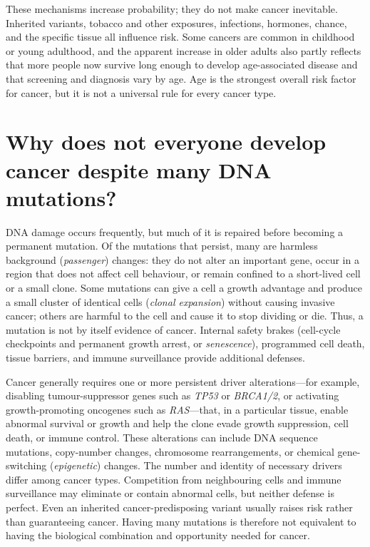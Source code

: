 \documentclass[11pt,oneside]{report}
\begin{document}
These mechanisms increase probability; they do not make cancer inevitable.
Inherited variants, tobacco and other exposures, infections, hormones, chance,
and the specific tissue all influence risk. Some cancers are common in
childhood or young adulthood, and the apparent increase in older adults also
partly reflects that more people now survive long enough to develop
age-associated disease and that screening and diagnosis vary by age. Age is the
strongest overall risk factor for cancer, but it is not a universal rule for
every cancer type.

\section{Why does not everyone develop cancer despite many DNA mutations?}

DNA damage occurs frequently, but much of it is repaired before becoming a
permanent mutation. Of the mutations that persist, many are harmless background
(\emph{passenger}) changes: they do not alter an important gene, occur in a
region that does not affect cell behaviour, or remain confined to a short-lived
cell or a small clone. Some mutations can give a cell a growth advantage and
produce a small cluster of identical cells (\emph{clonal expansion}) without
causing invasive cancer; others are harmful to the cell and cause it to stop
dividing or die. Thus, a mutation is not by itself evidence of cancer.
Internal safety brakes (cell-cycle checkpoints and permanent growth arrest, or
\emph{senescence}), programmed cell death, tissue barriers, and immune
surveillance provide additional defenses.

Cancer generally requires one or more persistent driver alterations—for
example, disabling tumour-suppressor genes such as \emph{TP53} or
\emph{BRCA1/2}, or activating growth-promoting oncogenes such as \emph{RAS}—that,
in a particular tissue, enable abnormal survival or growth and help the clone
evade growth suppression, cell death, or immune control. These alterations can
include DNA sequence mutations, copy-number changes, chromosome rearrangements,
or chemical gene-switching (\emph{epigenetic}) changes. The number and identity of necessary drivers differ among
cancer types. Competition from neighbouring
cells and immune surveillance may eliminate or contain abnormal cells, but
neither defense is perfect. Even an inherited cancer-predisposing variant
usually raises risk rather than guaranteeing cancer. Having many mutations is
therefore not equivalent to having the biological combination and opportunity
needed for cancer.
\end{document}
